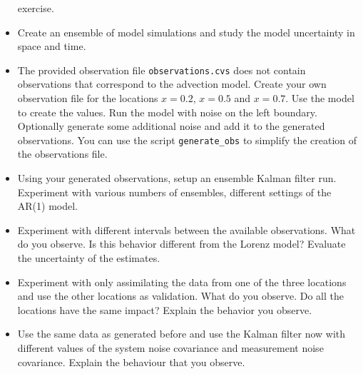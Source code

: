 \begin{itemize}
  exercise.
\item Create an ensemble of model simulations and study the model uncertainty
  in space and time.
\item The provided observation file {\tt observations.cvs} does not contain
  observations that correspond to the advection model. Create your own
  observation file for the locations $x=0.2$, $x=0.5$ and $x=0.7$. Use the
  model to create the values. Run the model with noise on the left boundary.
  Optionally generate some additional noise and add it to the generated
  observations. You can use the script {\tt generate\_obs} to simplify the
  creation of the observations file.
\item Using your generated observations, setup an ensemble Kalman filter run.
  Experiment with various numbers of ensembles, different settings of the AR(1)
  model.
\item Experiment with different intervals between the available observations.
  What do you observe. Is this behavior different from the Lorenz model?
  Evaluate the uncertainty of the estimates.
\item Experiment with only assimilating the data from one of the three
  locations and use the other locations as validation. What do you observe. Do
  all the locations have the same impact? Explain the behavior you observe.
\item Use the same data as generated before and use the Kalman filter now with
  different values of the system noise covariance and measurement noise
  covariance. Explain the behaviour that you observe.
\end{itemize}

